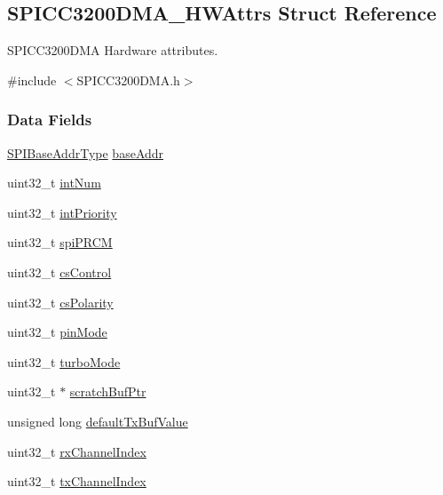 \subsection{S\+P\+I\+C\+C3200\+D\+M\+A\+\_\+\+H\+W\+Attrs Struct Reference}
\label{struct_s_p_i_c_c3200_d_m_a___h_w_attrs}


S\+P\+I\+C\+C3200\+D\+M\+A Hardware attributes.  




{\ttfamily \#include $<$S\+P\+I\+C\+C3200\+D\+M\+A.\+h$>$}

\subsubsection*{Data Fields}
\begin{DoxyCompactItemize}
\item 
\hyperlink{_s_p_i_c_c3200_d_m_a_8h_a4b7e9f3739f6196bed13f9c3c549c96d}{S\+P\+I\+Base\+Addr\+Type} \hyperlink{struct_s_p_i_c_c3200_d_m_a___h_w_attrs_a9c8d969d44a09aad6ed1682708147793}{base\+Addr}
\item 
uint32\+\_\+t \hyperlink{struct_s_p_i_c_c3200_d_m_a___h_w_attrs_ac7d7cbf69297785b0f10e52232123f99}{int\+Num}
\item 
uint32\+\_\+t \hyperlink{struct_s_p_i_c_c3200_d_m_a___h_w_attrs_a0c9a6ff2504e20e089c5b36beca95484}{int\+Priority}
\item 
uint32\+\_\+t \hyperlink{struct_s_p_i_c_c3200_d_m_a___h_w_attrs_ab2a88ac08b007f5f2487d8ec602e78c3}{spi\+P\+R\+C\+M}
\item 
uint32\+\_\+t \hyperlink{struct_s_p_i_c_c3200_d_m_a___h_w_attrs_a572279d530e6069590aab1a4f03b9228}{cs\+Control}
\item 
uint32\+\_\+t \hyperlink{struct_s_p_i_c_c3200_d_m_a___h_w_attrs_ab88c8ae0c67eb97a7fb6c01baf63daa1}{cs\+Polarity}
\item 
uint32\+\_\+t \hyperlink{struct_s_p_i_c_c3200_d_m_a___h_w_attrs_a0083ae69b92c56f2362b9d1681c9f26c}{pin\+Mode}
\item 
uint32\+\_\+t \hyperlink{struct_s_p_i_c_c3200_d_m_a___h_w_attrs_a597af63809cded916ce7024cba02b020}{turbo\+Mode}
\item 
uint32\+\_\+t $\ast$ \hyperlink{struct_s_p_i_c_c3200_d_m_a___h_w_attrs_a6f1e2c5e6ef54893d9e3677dab809bb7}{scratch\+Buf\+Ptr}
\item 
unsigned long \hyperlink{struct_s_p_i_c_c3200_d_m_a___h_w_attrs_a37cb12ed86423d12f273637dfe2aef47}{default\+Tx\+Buf\+Value}
\item 
uint32\+\_\+t \hyperlink{struct_s_p_i_c_c3200_d_m_a___h_w_attrs_af577e5b6488f282f910e7dbd733329f4}{rx\+Channel\+Index}
\item 
uint32\+\_\+t \hyperlink{struct_s_p_i_c_c3200_d_m_a___h_w_attrs_a1ad85ea904b8d879b260e46ef44d9882}{tx\+Channel\+Index}
\end{DoxyCompactItemize}


